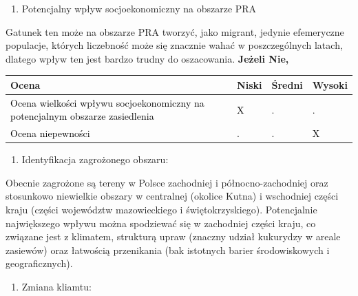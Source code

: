 \documentclass[polish,a4paper]{article}
\providecommand{\tightlist}{%
  \setlength{\itemsep}{0pt}\setlength{\parskip}{0pt}}
\begin{document}
\begin{enumerate}
\def\labelenumi{\Roman{enumi})}
\setcounter{enumi}{2}
\tightlist
\item
  Potencjalny wpływ socjoekonomiczny na obszarze PRA
\end{enumerate}

Gatunek ten może na obszarze PRA tworzyć, jako migrant, jedynie
efemeryczne populacje, których liczebność może się znacznie wahać w
poszczególnych latach, dlatego wpływ ten jest bardzo trudny do
oszacowania. \textbf{Jeżeli Nie,}

\begin{tabu} to 
\toprule
{}  \textbf{Ocena} & \textbf{Niski} & \textbf{Średni} & \textbf{Wysoki}\\
\midrule
{}  \textcolor{black}{Ocena wielkości wpływu socjoekonomiczny na potencjalnym obszarze zasiedlenia} & \textcolor{black}{X} & \textcolor{black}{.} & \textcolor{black}{.}\\
  \textcolor{black}{Ocena niepewności} & \textcolor{black}{.} & \textcolor{black}{.} & \textcolor{black}{X}\\
\bottomrule
\end{tabu}

\begin{enumerate}
\def\labelenumi{(\arabic{enumi})}
\setcounter{enumi}{13}
\tightlist
\item
  Identyfikacja zagrożonego obszaru:
\end{enumerate}

Obecnie zagrożone są tereny w Polsce zachodniej i północno-zachodniej
oraz stosunkowo niewielkie obszary w centralnej (okolice Kutna) i
wschodniej części kraju (części województw mazowieckiego i
świętokrzyskiego). Potencjalnie największego wpływu można spodziewać się
w zachodniej części kraju, co związane jest z klimatem, strukturą upraw
(znaczny udział kukurydzy w areale zasiewów) oraz łatwością przenikania
(bak istotnych barier środowiskowych i geograficznych).

\begin{enumerate}
\def\labelenumi{(\arabic{enumi})}
\setcounter{enumi}{14}
\tightlist
\item
  Zmiana kliamtu:
\end{enumerate}
\end{document}
